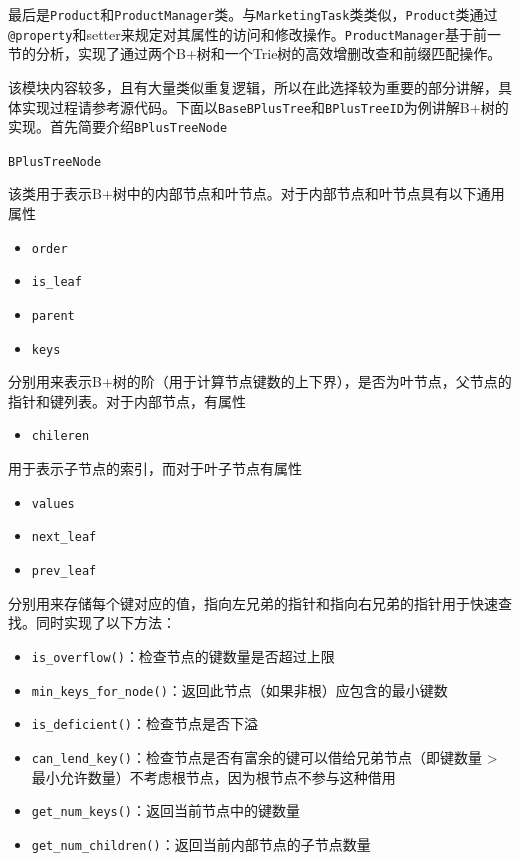 \documentclass[cn,hazy,blue,10pt,normal]{elegantnote}
\begin{document}
最后是\texttt{Product}和\texttt{ProductManager}类。与\texttt{MarketingTask}类类似，\texttt{Product}类通过\texttt{@property}和setter来规定对其属性的访问和修改操作。\texttt{ProductManager}基于前一节的分析，实现了通过两个B+树和一个Trie树的高效增删改查和前缀匹配操作。

该模块内容较多，且有大量类似重复逻辑，所以在此选择较为重要的部分讲解，具体实现过程请参考源代码。下面以\texttt{BaseBPlusTree}和\texttt{BPlusTreeID}为例讲解B+树的实现。首先简要介绍\texttt{BPlusTreeNode}

\texttt{BPlusTreeNode}

该类用于表示B+树中的内部节点和叶节点。对于内部节点和叶节点具有以下通用属性
\begin{itemize}
    \item \texttt{order}
    \item \texttt{is\_leaf}
    \item \texttt{parent}
    \item \texttt{keys}
\end{itemize}
分别用来表示B+树的阶（用于计算节点键数的上下界），是否为叶节点，父节点的指针和键列表。对于内部节点，有属性
\begin{itemize}
    \item \texttt{chileren}
\end{itemize}
用于表示子节点的索引，而对于叶子节点有属性
\begin{itemize}
    \item \texttt{values}
    \item \texttt{next\_leaf}
    \item \texttt{prev\_leaf}
\end{itemize}
分别用来存储每个键对应的值，指向左兄弟的指针和指向右兄弟的指针用于快速查找。同时实现了以下方法：
\begin{itemize}
    \item \texttt{is\_overflow()}：检查节点的键数量是否超过上限
    \item  \texttt{min\_keys\_for\_node()}：返回此节点（如果非根）应包含的最小键数
    \item  \texttt{is\_deficient()}：检查节点是否下溢
    \item  \texttt{can\_lend\_key()}：检查节点是否有富余的键可以借给兄弟节点（即键数量 > 最小允许数量）不考虑根节点，因为根节点不参与这种借用
    \item  \texttt{get\_num\_keys()}：返回当前节点中的键数量
    \item  \texttt{get\_num\_children()}：返回当前内部节点的子节点数量
\end{itemize}
\end{document}
